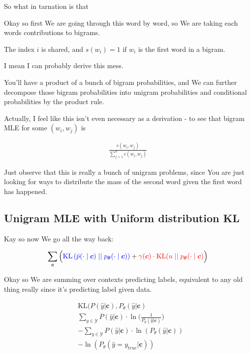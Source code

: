 \documentclass{article}
\newcommand{\KL}{\mathrm{KL}}
\newcommand{\uniform}{u}
\newcommand{\vtheta}{\boldsymbol{\theta}}
\newcommand{\model}{p_{\vtheta}}
\newcommand{\context}{\boldsymbol{c}}
\begin{document}
		So what in tarnation is that
		
		Okay so first We are going through this word by word, so We are taking each words contributions to bigrams. 
		
		The index $i$ is shared, and $s(w_i) = 1$ if $w_i$ is the first word in a bigram.
		
		I mean I can probably derive this mess. 
		
		You'll have a product of a bunch of bigram probabilities, and We can further decompose those bigram probabilities into unigram probabilities and conditional probabilities by the product rule.
		
		Actually, I feel like this isn't even necessary as a derivation - to see that bigram MLE for some $(w_i, w_j)$ is
		
		\begin{align}
			\frac{c(w_i, w_j)}{\sum_{j=1}^n c(w_i, w_j)}
		\end{align}
		
		Just observe that this is really a bunch of unigram problems, since You are just looking for ways to distribute the mass of the second word given the first word has happened.
		
	\subsection{Unigram MLE with Uniform distribution KL}
	
		Kay so now We go all the way back:
		
		\begin{align}
	  	 \sum_{\context} \Big( {\color{blue} \KL\left(\tilde{p}(\cdot 			\mid \context) \mid\mid \model(\cdot \mid \context)					\right)} + {\color{red}\gamma(\context) \cdot 						\KL(\uniform \mid\mid \model(\cdot \mid \context)}\Big)
		\end{align}
		
		Okay so We are summing over contexts predicting labels, equivalent to any old thing really since it's predicting label given data.
		
		\begin{align}
			&\KL(P(\hat{y}|\context), P_\theta(\hat{y}|\context)\\
			&\sum_{y\in\mathcal{Y}} P(\hat{y}|\context )\cdot\ln\bigg(\frac{1}{P_\theta(\hat{y}|\context)} \bigg)\\
			& - \sum_{y\in\mathcal{Y}} P(\hat{y}|\context )\cdot\ln(P_\theta(\hat{y}|\context))\\
			& -\ln(P_\theta(\hat{y} = y_{true}|\context))
		\end{align}
		
\end{document}
